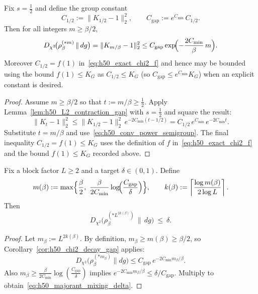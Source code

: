 \begin{corollary}\label{cor:h50_chi2_decay_gap}
Fix $s=\tfrac12$ and define the group constant
\begin{equation}\label{eq:h50_Cgap_def}
C_{1/2}:=\|K_{1/2}-1\|_2^2,\qquad C_{\mathrm{gap}}:=e^{C_{\min}}\,C_{1/2}.
\end{equation}
Then for all integers $m\ge \beta/2$,
\begin{equation}\label{eq:h50_gap_decay}
D_{\chi^2}\!\bigl(\rho_\beta^{(*m)}\,\|\,dg\bigr)
=\|K_{m/\beta}-1\|_2^2
\le C_{\mathrm{gap}}\exp\!\Bigl(-\frac{2C_{\min}}{\beta}\,m\Bigr).
\end{equation}
Moreover $C_{1/2}=f(1)$ in~\eqref{eq:h50_exact_chi2_f} and hence may be bounded using the bound $f(1)\le K_G$ as
$C_{1/2}\le K_G$ (so $C_{\mathrm{gap}}\le e^{C_{\min}}K_G$) when an explicit constant is desired.
\end{corollary}

\begin{proof}
Assume $m\ge \beta/2$ so that $t:=m/\beta\ge \tfrac12$.
Apply Lemma~\ref{lem:h50_L2_contraction_gap} with $s=\tfrac12$ and square the result:
\[
\|K_t-1\|_2^2\le \|K_{1/2}-1\|_2^2\,e^{-2C_{\min}(t-1/2)}
=C_{1/2}\,e^{C_{\min}}\,e^{-2C_{\min}t}.
\]
Substitute $t=m/\beta$ and use~\eqref{eq:h50_conv_power_semigroup}.
The final inequality $C_{1/2}=f(1)\le K_G$ uses the definition of $f$ in~\eqref{eq:h50_exact_chi2_f}
and the bound $f(1)\le K_G$ recorded above.
\end{proof}

\begin{proposition}\label{prop:h50_kbeta}
Fix a block factor $L\ge 2$ and a target $\delta\in(0,1)$.
Define
\begin{equation}\label{eq:h50_kbeta_def}
m(\beta):=\max\Bigl\{\frac{\beta}{2},\ \frac{\beta}{2C_{\min}}\log\!\Bigl(\frac{C_{\mathrm{gap}}}{\delta}\Bigr)\Bigr\},
\qquad
k(\beta):=\left\lceil \frac{\log m(\beta)}{2\log L}\right\rceil.
\end{equation}
Then
\begin{equation}\label{eq:h50_majorant_mixing_delta}
D_{\chi^2}\!\bigl(\rho_\beta^{(*L^{2k(\beta)})}\,\|\,dg\bigr)\ \le\ \delta.
\end{equation}
\end{proposition}

\begin{proof}
Let $m_\beta:=L^{2k(\beta)}$. By definition, $m_\beta\ge m(\beta)\ge \beta/2$, so Corollary~\ref{cor:h50_chi2_decay_gap} applies:
\[
D_{\chi^2}\!\bigl(\rho_\beta^{(*m_\beta)}\|dg\bigr)\le C_{\mathrm{gap}}\,e^{-2C_{\min}m_\beta/\beta}.
\]
Also $m_\beta\ge \frac{\beta}{2C_{\min}}\log(\frac{C_{\mathrm{gap}}}{\delta})$ implies
$e^{-2C_{\min}m_\beta/\beta}\le \delta/C_{\mathrm{gap}}$. Multiply to obtain~\eqref{eq:h50_majorant_mixing_delta}.
\end{proof}

